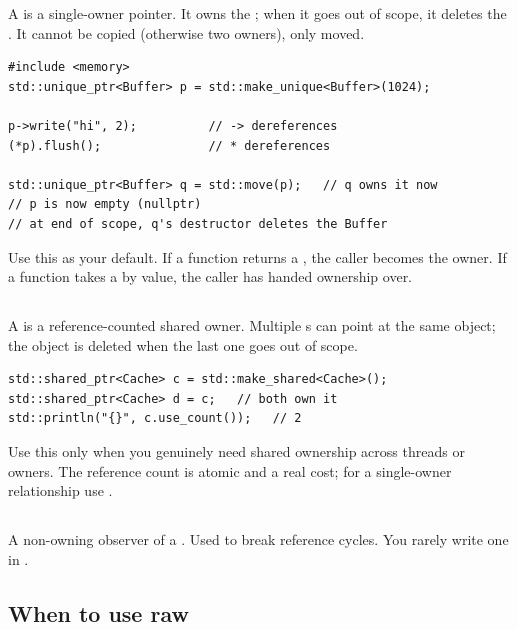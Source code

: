 A  is a single-owner pointer. It owns the
; when it goes out of scope, it deletes the . It
cannot be copied (otherwise two owners), only moved.

\begin{lstlisting}
#include <memory>
std::unique_ptr<Buffer> p = std::make_unique<Buffer>(1024);

p->write("hi", 2);          // -> dereferences
(*p).flush();               // * dereferences

std::unique_ptr<Buffer> q = std::move(p);   // q owns it now
// p is now empty (nullptr)
// at end of scope, q's destructor deletes the Buffer
\end{lstlisting}

Use this as your default. If a function returns a
, the caller becomes the owner. If a function
takes a  by value, the caller has handed
ownership over.

\subsection{}

A  is a reference-counted shared owner.
Multiple s can point at the same object; the
object is deleted when the last one goes out of scope.

\begin{lstlisting}
std::shared_ptr<Cache> c = std::make_shared<Cache>();
std::shared_ptr<Cache> d = c;   // both own it
std::println("{}", c.use_count());   // 2
\end{lstlisting}

Use this only when you genuinely need shared ownership across
threads or owners. The reference count is atomic and a real cost;
for a single-owner relationship use .

\subsection{}

A non-owning observer of a . Used to break
reference cycles. You rarely write one in \maya{}.

\subsection{When to use raw }

